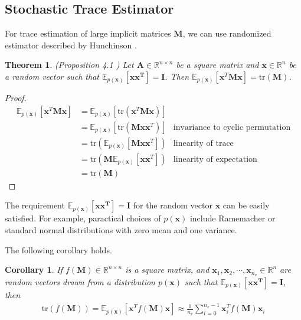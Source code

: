 \documentclass[senior,final,11pt]{iscs-thesis}
\newtheorem{theorem}{Theorem}
\newtheorem{corollary}{Corollary}[theorem]
\begin{document}
\subsection{Stochastic Trace Estimator} \label{STE}
For trace estimation of large implicit matrices $\mathbf{M}$, we can use randomized estimator described by Hunchinson \cite{hutchinson1989stochastic, adams2018estimating}.
\begin{theorem}
    \label{Hunchinson}
    (Proposition 4.1 \cite{adams2018estimating}) Let ${\mathbf A} \in \mathbb{R}^{n\times n}$ be a square matrix and $\mathbf{x} \in \mathbb{R}^n$ be a random vector such that $\mathbb{E}_{p(\mathbf{x})}[\mathbf{xx^T}] = \mathbf{I}$. Then $\mathbb{E}_{p(\mathbf{x})}[\mathbf{x}^{T}\mathbf{M}\mathbf{x}] = \mathrm{tr}(\mathbf{M})$.
\end{theorem}

\begin{proof}
    \begin{align*}
        \mathbb{E}_{p(\mathbf{x})}[\mathbf{x}^{T}\mathbf{M}\mathbf{x}] &= \mathbb{E}_{p(\mathbf{x})}[\mathrm{tr}(\mathbf{x}^{T}\mathbf{M}\mathbf{x})] \\
          &=  \mathbb{E}_{p(\mathbf{x})}[\mathrm{tr}(\mathbf{M}\mathbf{x}\mathbf{x}^{T})]  &\text{invariance to cyclic permutation} \\
          &= \mathrm{tr}(\mathbb{E}_{p(\mathbf{x})}[\mathbf{M}\mathbf{x}\mathbf{x}^{T}] ) &\text{linearity of trace}  \\
          &= \mathrm{tr}(\mathbf{M}\mathbb{E}_{p(\mathbf{x})}[\mathbf{x}\mathbf{x}^{T}] ) &\text{linearity of expectation}  \\
          &= \mathrm{tr}(\mathbf{M})
    \end{align*}
\end{proof}

The requirement $\mathbb{E}_{p(\mathbf{x})}[\mathbf{xx^T}] = \mathbf{I}$ for the random vector  $\mathbf{x}$ can be easily satisfied. For example, paractical choices of $p(\mathbf{x})$ include Ramemacher or standard normal distributions with zero mean and one variance.

The following corollary holds.

\begin{corollary}
    \label{approxtrace}
    If $f(\mathbf{M}) \in \mathbb{R}^{n\times n}$ is a square matrix, and $\mathbf{x}_1, \mathbf{x}_2, \cdots, \mathbf{x}_{n_v} \in \mathbb{R}^n$ are random vectors drawn from a distribution $p(\mathbf{x})$ such that $\mathbb{E}_{p(\mathbf{x})}[\mathbf{xx^T}] = \mathbf{I}$, then
    \begin{align*}
        \mathrm{tr}(f(\mathbf{M})) =\mathbb{E}_{p(\mathbf{x})}[\mathbf{x}^{T}f(\mathbf{M})\mathbf{x}] \approx \frac{1}{n_v}\sum_{i=0}^{n_v-1} \mathbf{x}_i^{T}f(\mathbf{M})\mathbf{x}_i
    \end{align*}
\end{corollary}
\end{document}
